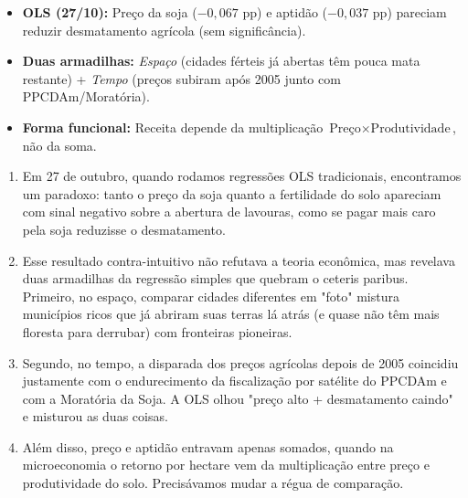 \documentclass[11pt,a4paper]{article}
\begin{document}
\begin{tcolorbox}[title={\bfseries\small ÂNCORAS DO SLIDE}]
\begin{itemize}[leftmargin=*,itemsep=1mm,topsep=0.5mm]
    \item \textbf{OLS (27/10):} Preço da soja ($-0{,}067$ pp) e aptidão ($-0{,}037$ pp) pareciam reduzir desmatamento agrícola (sem significância).
    \item \textbf{Duas armadilhas:} \textit{Espaço} (cidades férteis já abertas têm pouca mata restante) + \textit{Tempo} (preços subiram após 2005 junto com PPCDAm/Moratória).
    \item \textbf{Forma funcional:} Receita depende da multiplicação $\text{Preço} \times \text{Produtividade}$, não da soma.
\end{itemize}
\end{tcolorbox}
\vspace{2mm}

\vspace{1mm}
\begin{enumerate}[leftmargin=*,label=\textbf{(\arabic*)},itemsep=2.6mm,topsep=1mm]
    \item Em 27 de outubro, quando rodamos regressões OLS tradicionais, encontramos um paradoxo: tanto o preço da soja quanto a fertilidade do solo apareciam com sinal negativo sobre a abertura de lavouras, como se pagar mais caro pela soja reduzisse o desmatamento.
    \item Esse resultado contra-intuitivo não refutava a teoria econômica, mas revelava duas armadilhas da regressão simples que quebram o ceteris paribus. Primeiro, no espaço, comparar cidades diferentes em "foto" mistura municípios ricos que já abriram suas terras lá atrás (e quase não têm mais floresta para derrubar) com fronteiras pioneiras.
    \item Segundo, no tempo, a disparada dos preços agrícolas depois de 2005 coincidiu justamente com o endurecimento da fiscalização por satélite do PPCDAm e com a Moratória da Soja. A OLS olhou "preço alto + desmatamento caindo" e misturou as duas coisas.
    \item Além disso, preço e aptidão entravam apenas somados, quando na microeconomia o retorno por hectare vem da multiplicação entre preço e produtividade do solo. Precisávamos mudar a régua de comparação.
\end{enumerate}

\newpage
\end{document}
